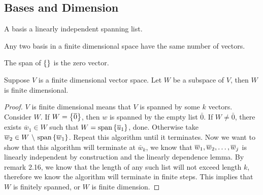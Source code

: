 \subsection{Bases and Dimension}
\begin{definition}
    A basis a linearly independent spanning list.
\end{definition}
\begin{theorem}
    Any two basis in a finite dimensional space have the same number of vectors.
\end{theorem}
\begin{remark}
    The span of $\left\{ \right\}$ is the zero vector.
\end{remark}
\begin{theorem}
    Suppose $V$ is a finite dimensional vector space. Let $W$ be a subspace of $V$, then $W$ is finite dimensional.
\end{theorem}
\begin{proof}
    $V$ is finite dimensional means that $V$ is spanned by some $k$ vectors. Consider $W$. If $W = \left\{ \overline 0 \right\}$, then $w$ is spanned by the empty list $\bar 0$. If $W \neq \bar 0$, there exists $\bar w_1 \in W$ such that $W = \text{span}\left\{ \overline u_1 \right\}$, done. Otherwise take $\bar w_2 \in W \ \backslash \  \spa \lb \bar w_1 \rb$. Repeat this algorithm until it terminates. Now we want to show that this algorithm will terminate at $\bar w_k$, we know that ${\overline w}_1,{\overline w}_2, \ldots, {\overline w}_{j}$ is linearly independent by construction and the linearly dependence lemma. By remark 2.16, we know that the length of any such list will not exceed length $k$, therefore we know the algorithm will terminate in finite steps. This implies that $W$ is finitely spanned, or $W$ is finite dimension.
\end{proof}
